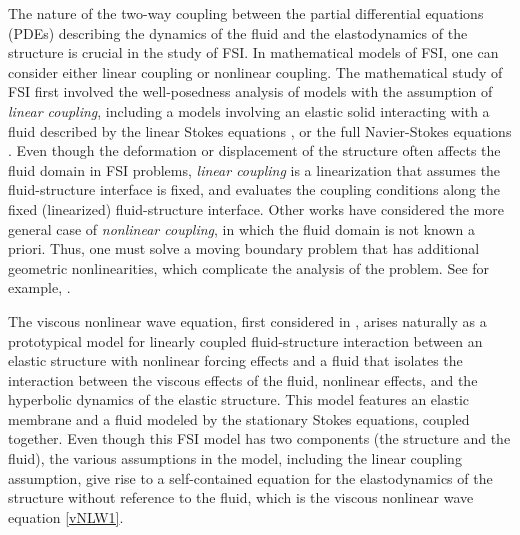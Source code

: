 \documentclass[letterpaper, 11pt,  reqno]{amsart}
\newcommand{\1}{\hspace{0.5mm}\text{I}\hspace{0.2mm}}
\numberwithin{equation}{section}
\numberwithin{theorem}{section}
\begin{document}
The nature of the two-way coupling between the partial differential equations
(PDEs)
 describing the dynamics of the fluid and the elastodynamics of the structure is crucial in the study of FSI. In mathematical models of FSI, one can consider either linear coupling or nonlinear coupling. The mathematical study of FSI first involved the well-posedness analysis of models with the assumption of \textit{linear coupling}, including a models involving an elastic solid interacting with a fluid described by the linear Stokes equations \cite{Gunzburger}, or the full Navier-Stokes equations \cite{BarGruLasTuff2,BarGruLasTuff,KukavicaTuffahaZiane}. Even though the deformation or displacement of the structure often affects the fluid domain in FSI problems, \textit{linear coupling} is a linearization that assumes the fluid-structure interface is fixed, and evaluates the coupling conditions along the fixed (linearized) fluid-structure interface. Other works have considered the more general case of \textit{nonlinear coupling}, in which the fluid domain is not known a priori. Thus, one must solve a moving boundary problem that has  additional geometric nonlinearities, which complicate the analysis of the problem. See for example, \cite{BdV1,Lequeurre,FSIforBIO_Lukacova,CDEM,CG,MuhaCanic13,
BorSun3d,LengererRuzicka,CSS1,CSS2,Kuk,ChenShkoller,ChengShkollerCoutand,IgnatovaKukavica,Raymod,ignatova2014well,
BorSunSlip,BorSunNonLinearKoiter,BorSunMultiLayered,Grandmont16, CanicCMAME}.

The viscous nonlinear wave equation, first considered in \cite{KC}, arises naturally as a prototypical model for linearly coupled fluid-structure interaction between an elastic structure with nonlinear forcing effects and a fluid that isolates the interaction between the viscous effects of the fluid, nonlinear effects, and the hyperbolic dynamics of the elastic structure. This model features an elastic membrane and a fluid modeled by the stationary Stokes equations, coupled together. Even though this FSI model has two components (the structure and the fluid), the various assumptions in the model, including the linear coupling assumption, give rise to a self-contained equation for the elastodynamics of the structure without reference to the fluid, which is the viscous nonlinear wave equation \eqref{vNLW1}.
\end{document}
